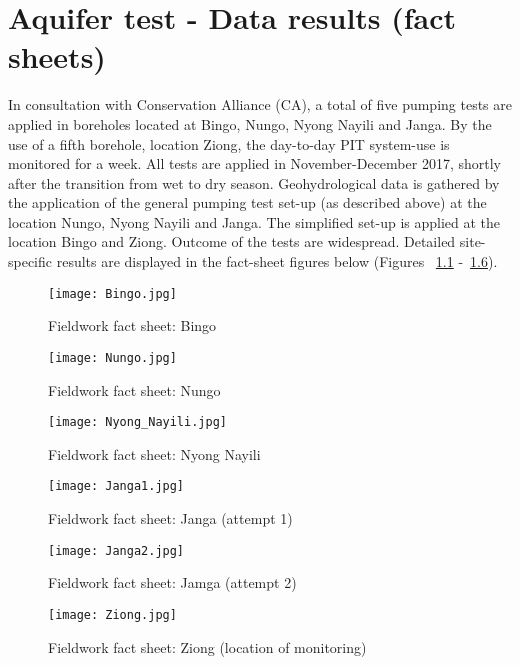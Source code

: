 \chapter{Aquifer test - Data results (fact sheets)}
\label{chapter:fieldworkresults}
In consultation with Conservation Alliance (CA), a total of five pumping tests are applied in boreholes located at Bingo, Nungo, Nyong Nayili and Janga. By the use of a fifth borehole, location Ziong, the day-to-day PIT system-use is monitored for a week. All tests are applied in November-December 2017, shortly after the transition from wet to dry season. Geohydrological data is gathered by the application of the general pumping test set-up (as described above) at the location Nungo, Nyong Nayili and Janga. The simplified set-up is applied at the location Bingo and Ziong. Outcome of the tests are widespread. Detailed site-specific results are displayed in the fact-sheet figures below (Figures ~\ref{fig:Bingo} -~\ref{fig:Ziong}).

\begin{figure}[h!]
 \centering\texttt{[image: Bingo.jpg]}
 \captionsetup{justification=centering}
 \caption{Fieldwork fact sheet: Bingo}
 \label{fig:Bingo}
\end{figure} 

\begin{figure}[h!]
 \centering\texttt{[image: Nungo.jpg]}
 \captionsetup{justification=centering}
 \caption{Fieldwork fact sheet: Nungo}
 \label{fig:Nungo}
\end{figure} 

\begin{figure}[h!]
 \centering\texttt{[image: Nyong\_Nayili.jpg]}
 \captionsetup{justification=centering}
 \caption{Fieldwork fact sheet: Nyong Nayili}
 \label{fig:Nyong_Nayili}
\end{figure} 

\begin{figure}[h!]
 \centering\texttt{[image: Janga1.jpg]}
 \captionsetup{justification=centering}
 \caption{Fieldwork fact sheet: Janga (attempt 1)}
 \label{fig:Janga1}
\end{figure} 

\begin{figure}[h!]
 \centering\texttt{[image: Janga2.jpg]}
 \captionsetup{justification=centering}
 \caption{Fieldwork fact sheet: Jamga (attempt 2)}
 \label{fig:Janga2}
\end{figure} 

\begin{figure}[h!]
 \centering\texttt{[image: Ziong.jpg]}
 \captionsetup{justification=centering}
 \caption{Fieldwork fact sheet: Ziong (location of monitoring)}
 \label{fig:Ziong}
\end{figure} 